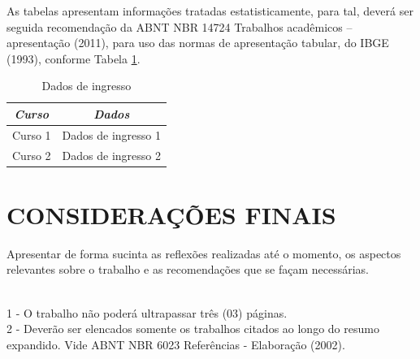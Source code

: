 \documentclass{furgmpu}
\begin{document}
    As tabelas apresentam informações tratadas estatisticamente, para tal, deverá ser seguida recomendação da ABNT NBR 14724 Trabalhos acadêmicos – apresentação (2011), para uso das normas de apresentação tabular, do IBGE (1993), conforme Tabela \ref{tab:tabela}. 
    
    \begin{table}[ht]
        \centering
        \caption{Dados de ingresso}
        \begin{tabular}{cc}
            \toprule
            \textbf{\textit{Curso}}  & \textbf{\textit{Dados}} \\
            \midrule
            Curso 1 & Dados de ingresso 1\\
            Curso 2 & Dados de ingresso 2\\
            \bottomrule
        \end{tabular}
        \label{tab:tabela}
    \end{table}
    
    
    \section{CONSIDERAÇÕES FINAIS}
    Apresentar de forma sucinta as reflexões realizadas até o momento, os aspectos relevantes sobre o trabalho e as recomendações que se façam necessárias.
    
    

     \\
    1 - O trabalho não poderá ultrapassar três (03) páginas.\\
    2 - Deverão ser elencados somente os trabalhos citados ao longo do resumo expandido. Vide ABNT NBR 6023 Referências - Elaboração (2002). 
\end{document}
